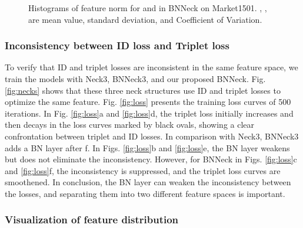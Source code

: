 \documentclass[journal]{IEEEtran}
\begin{document}
\begin{figure*}
\centering
{}
\centering
{}\caption{Histograms of feature norm for  and  in BNNeck on Market1501. , ,  are mean value, standard deviation, and Coefficient of Variation.}\label{fig:feat}
\vspace{-3mm}
\end{figure*}

\subsubsection{Inconsistency between ID loss and Triplet loss}


To verify that ID and triplet losses are inconsistent in the same feature space, we train the models with Neck3, BNNeck3, and our proposed BNNeck.
Fig. \ref{fig:necks} shows that these three neck structures use ID and triplet losses to optimize the same feature.
Fig. \ref{fig:loss} presents the training loss curves of 500 iterations.
In Fig. \ref{fig:loss}a and \ref{fig:loss}d, the triplet loss initially increases and then decays in the loss curves marked by black ovals, showing a clear confrontation between triplet and ID losses.
In comparison with Neck3, BNNeck3 adds a BN layer after f. In Figs. \ref{fig:loss}b and \ref{fig:loss}e, the BN layer weakens but does not eliminate the inconsistency.
However, for BNNeck in Figs. \ref{fig:loss}c and \ref{fig:loss}f, the inconsistency is suppressed, and the triplet loss curves are smoothened.
In conclusion, the BN layer can weaken the inconsistency between the losses, and separating them into two different feature spaces is important.

\subsubsection{Visualization of feature distribution}
\end{document}
